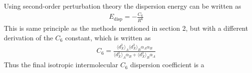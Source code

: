 \documentclass[10pt,a4paper,twocolumn,twoside]{extarticle}
\begin{document}
	Using second-order perturbation theory\cite{XDM-dipole} the dispersion energy can be written as 
	\begin{align}
		E_\text{disp} = -\frac{C_6}{R^6}
	\end{align}
	This is same principle as the methods mentioned in section 2, but with a different derivation of the $C_6$ constant, which is written as
	\begin{align}
		C_6 = \frac{\langle d_X^2 \rangle_A \langle d_X^2 \rangle_B \alpha_A \alpha_B}{\langle d_X^2 \rangle_A\alpha_B + \langle d_X^2 \rangle_B\alpha_A}
	\end{align} 
	Thus the final isotropic intermolecular $C_6$ dispersion coefficient is a 

	\newpage
	\printbibliography
\end{document}
